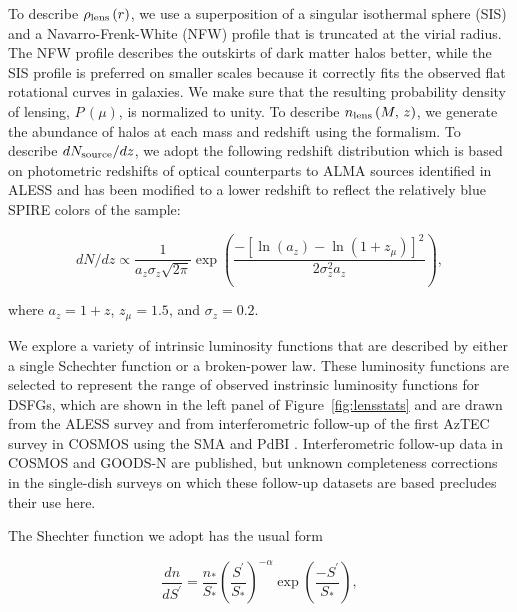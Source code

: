 \documentclass[iop]{emulateapj}
\begin{document}
To describe $\rho_{\rm lens}\,(r)$, we use a superposition of a singular
isothermal sphere (SIS) and a Navarro-Frenk-White (NFW) profile
\citep{Navarro:1997ys} that is truncated at the virial radius.  The NFW profile
describes the outskirts of dark matter halos better, while the SIS profile is
preferred on smaller scales because it correctly fits the observed flat
rotational curves in galaxies.  We make sure that the resulting probability
density of lensing, $P\,(\mu)$, is normalized to unity.  To describe $n_{\rm
lens}\,(M, \, z)$, we generate the abundance of halos at each mass and redshift
using the \citet{Sheth:1999kx} formalism.  To describe $dN_{\rm source}/dz$, we
adopt the following redshift distribution which is based on photometric
redshifts of optical counterparts to ALMA sources identified in ALESS
\citep{Simpson:2014lr} and has been modified to a lower redshift to reflect the
relatively blue SPIRE colors of the sample:

\begin{equation}
    dN/dz \propto \frac{1}{a_z\sigma_z \sqrt{2\pi}}
    \exp\left( \frac{-[\ln(a_z) - \ln(1 + z_\mu)]^2} {2\sigma_z^2 a_z} \right),
\end{equation}

\noindent where $a_z = 1 + z$, $z_\mu = 1.5$, and $\sigma_z = 0.2$. 

We explore a variety of intrinsic luminosity functions that are described by
either a single Schechter function or a broken-power law.  These luminosity
functions are selected to represent the range of observed instrinsic luminosity
functions for DSFGs, which are shown in the left panel of
Figure~\ref{fig:lensstats} and are drawn from the ALESS survey
\citep{Karim:2013lr} and from interferometric follow-up of the first AzTEC
survey in COSMOS \citep{Scott:2008qy} using the SMA \citep{Younger:2007fk,
Younger:2009lr} and PdBI \citep{Miettinen:2015lr}.  Interferometric follow-up
data in COSMOS \citep{Smolcic:2012zl} and GOODS-N \citep{Barger:2012yg} are
published, but unknown completeness corrections in the single-dish surveys on
which these follow-up datasets are based precludes their use here.

The Shechter function we adopt has the usual form \citep{Schechter:1976yq}

\begin{equation}
\frac{dn}{dS^\prime} = \frac{n_\ast}{S_\ast}
\left(\frac{S^\prime}{S_\ast}\right)^{-\alpha}
\exp\left(\frac{-S^\prime}{S_\ast}\right),
\end{equation}
\end{document}
